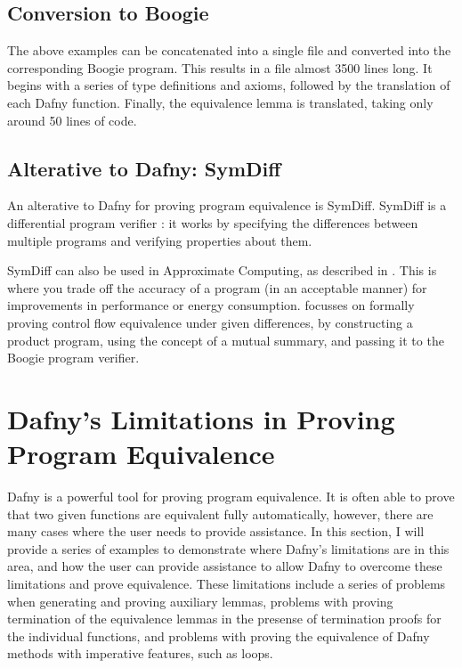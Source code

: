 \documentclass[a4paper, 11pt]{article}
\begin{document}
\subsection{Conversion to Boogie}

The above examples can be concatenated into a single file and converted into the corresponding Boogie program. This results in a file almost 3500 lines long. It begins with a series of type definitions and axioms, followed by the translation of each Dafny function. Finally, the equivalence lemma is translated, taking only around 50 lines of code. 

\subsection{Alterative to Dafny: SymDiff}

An alterative to Dafny for proving program equivalence is SymDiff. SymDiff is a differential program verifier \parencite{lahiriSYMDIFFLanguageAgnosticSemantic2012}: it works by specifying the differences between multiple programs and verifying properties about them.

SymDiff can also be used in Approximate Computing, as described in \textcite{lahiriAutomatedDifferentialProgramb}. This is where you trade off the accuracy of a program (in an acceptable manner) for improvements in performance or energy consumption. \textcite{lahiriAutomatedDifferentialProgramb} focusses on formally proving control flow equivalence under given differences, by constructing a product program, using the concept of a mutual summary, and passing it to the Boogie program verifier.

\section{Dafny's Limitations in Proving Program Equivalence}

Dafny is a powerful tool for proving program equivalence. It is often able to prove that two given functions are equivalent fully automatically, however, there are many cases where the user needs to provide assistance. In this section, I will provide a series of examples to demonstrate where Dafny's limitations are in this area, and how the user can provide assistance to allow Dafny to overcome these limitations and prove equivalence. These limitations include a series of problems when generating and proving auxiliary lemmas, problems with proving termination of the equivalence lemmas in the presense of termination proofs for the individual functions, and problems with proving the equivalence of Dafny methods with imperative features, such as loops.
\end{document}

